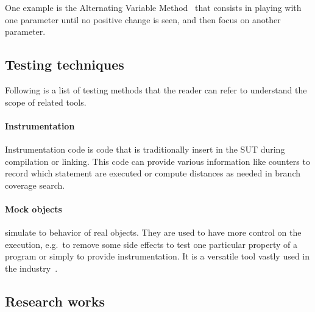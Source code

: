 \documentclass{llncs2e/llncs}
\begin{document}
One example is the Alternating Variable Method~\cite{mcminn2016avmf} that
consists in playing with one parameter until no positive change is seen, and
then focus on another parameter.


\subsection{Testing techniques} %
\label{techniques}

Following is a list of testing methods that the reader can refer to understand
the scope of related tools.

\paragraph{Instrumentation} Instrumentation code is code that is traditionally
insert in the SUT during compilation or linking. This code can provide various
information like counters to record which statement are executed or compute
distances as needed in branch coverage search.

\paragraph{Mock objects} simulate to behavior of real objects. They are used to
have more control on the execution, e.g.\ to remove some side effects to test
one particular property of a program or simply to provide instrumentation. It is
a versatile tool vastly used in the
industry~\cite{mackinnon2000endo,taneja2010moda,freeman2004mock,tillmann2006mock}.


\subsection{Research works}
\label{related_research}
\end{document}
